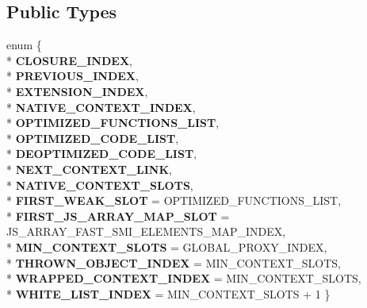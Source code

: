 \subsection*{Public Types}
\begin{DoxyCompactItemize}
\item 
enum \{ \\*
{\bfseries C\+L\+O\+S\+U\+R\+E\+\_\+\+I\+N\+D\+EX}, 
\\*
{\bfseries P\+R\+E\+V\+I\+O\+U\+S\+\_\+\+I\+N\+D\+EX}, 
\\*
{\bfseries E\+X\+T\+E\+N\+S\+I\+O\+N\+\_\+\+I\+N\+D\+EX}, 
\\*
{\bfseries N\+A\+T\+I\+V\+E\+\_\+\+C\+O\+N\+T\+E\+X\+T\+\_\+\+I\+N\+D\+EX}, 
\\*
{\bfseries O\+P\+T\+I\+M\+I\+Z\+E\+D\+\_\+\+F\+U\+N\+C\+T\+I\+O\+N\+S\+\_\+\+L\+I\+ST}, 
\\*
{\bfseries O\+P\+T\+I\+M\+I\+Z\+E\+D\+\_\+\+C\+O\+D\+E\+\_\+\+L\+I\+ST}, 
\\*
{\bfseries D\+E\+O\+P\+T\+I\+M\+I\+Z\+E\+D\+\_\+\+C\+O\+D\+E\+\_\+\+L\+I\+ST}, 
\\*
{\bfseries N\+E\+X\+T\+\_\+\+C\+O\+N\+T\+E\+X\+T\+\_\+\+L\+I\+NK}, 
\\*
{\bfseries N\+A\+T\+I\+V\+E\+\_\+\+C\+O\+N\+T\+E\+X\+T\+\_\+\+S\+L\+O\+TS}, 
\\*
{\bfseries F\+I\+R\+S\+T\+\_\+\+W\+E\+A\+K\+\_\+\+S\+L\+OT} = O\+P\+T\+I\+M\+I\+Z\+E\+D\+\_\+\+F\+U\+N\+C\+T\+I\+O\+N\+S\+\_\+\+L\+I\+ST, 
\\*
{\bfseries F\+I\+R\+S\+T\+\_\+\+J\+S\+\_\+\+A\+R\+R\+A\+Y\+\_\+\+M\+A\+P\+\_\+\+S\+L\+OT} = J\+S\+\_\+\+A\+R\+R\+A\+Y\+\_\+\+F\+A\+S\+T\+\_\+\+S\+M\+I\+\_\+\+E\+L\+E\+M\+E\+N\+T\+S\+\_\+\+M\+A\+P\+\_\+\+I\+N\+D\+EX, 
\\*
{\bfseries M\+I\+N\+\_\+\+C\+O\+N\+T\+E\+X\+T\+\_\+\+S\+L\+O\+TS} = G\+L\+O\+B\+A\+L\+\_\+\+P\+R\+O\+X\+Y\+\_\+\+I\+N\+D\+EX, 
\\*
{\bfseries T\+H\+R\+O\+W\+N\+\_\+\+O\+B\+J\+E\+C\+T\+\_\+\+I\+N\+D\+EX} = M\+I\+N\+\_\+\+C\+O\+N\+T\+E\+X\+T\+\_\+\+S\+L\+O\+TS, 
\\*
{\bfseries W\+R\+A\+P\+P\+E\+D\+\_\+\+C\+O\+N\+T\+E\+X\+T\+\_\+\+I\+N\+D\+EX} = M\+I\+N\+\_\+\+C\+O\+N\+T\+E\+X\+T\+\_\+\+S\+L\+O\+TS, 
\\*
{\bfseries W\+H\+I\+T\+E\+\_\+\+L\+I\+S\+T\+\_\+\+I\+N\+D\+EX} = M\+I\+N\+\_\+\+C\+O\+N\+T\+E\+X\+T\+\_\+\+S\+L\+O\+TS + 1
 \}\hypertarget{classv8_1_1internal_1_1_context_ad016363813ef4801a499a1f2932746bb}{}\label{classv8_1_1internal_1_1_context_ad016363813ef4801a499a1f2932746bb}


\end{DoxyCompactItemize}
